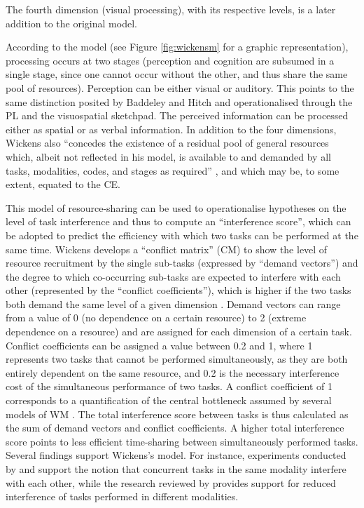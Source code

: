 The fourth dimension (visual processing), with its respective levels, is a later addition \citep{wickens_multiple_2002} to the original model.


According to the model (see Figure \ref{fig:wickensm} for a graphic representation), processing occurs at two stages (perception and cognition are subsumed in a single stage, since one cannot occur without the other, and thus share the same pool of resources). Perception can be either visual or auditory. This points to the same distinction posited by Baddeley and Hitch and operationalised through the PL and the visuospatial sketchpad. The perceived information can be processed either as spatial or as verbal information. In addition to the four dimensions, Wickens also ``concedes the existence of a residual pool of general resources which, albeit not reflected in his model, is available to and demanded by all tasks, modalities, codes, and stages as required'' \citep[1382]{seeber_thinking_2007}, and which may be, to some extent, equated to the CE.

This model of resource-sharing can be used to operationalise hypotheses on the level of task interference and thus to compute an ``interference score'', which can be adopted to predict the efficiency with which two tasks can be performed at the same time. Wickens develops a ``conflict matrix'' (CM) to show the level of resource recruitment by the single sub-tasks (expressed by ``demand vectors'') and the degree to which co-occurring sub-tasks are expected to interfere with each other (represented by the ``conflict coefficients''), which is higher if the two tasks both demand the same level of a given dimension \citep{wickens_multiple_2002}. Demand vectors can range from a value of 0 (no dependence on a certain resource) to 2 (extreme dependence on a resource) and are assigned for each dimension of a certain task. Conflict coefficients can be assigned a value between 0.2 and 1, where 1 represents two tasks that cannot be performed simultaneously, as they are both entirely dependent on the same resource, and 0.2 is the necessary interference cost of the simultaneous performance of two tasks. A conflict coefficient of 1 corresponds to a quantification of the central bottleneck assumed by several models of WM \citep{wickens_multiple_2002}. The total interference score between tasks is thus calculated as the sum of demand vectors and conflict coefficients. A higher total interference score points to less efficient time-sharing between simultaneously performed tasks. Several findings support Wickens's model. For instance, experiments conducted by \citet{wolfe_divided_2012} and \citet{mcleod_dual_1977} support the notion that concurrent tasks in the same modality interfere with each other, while the research reviewed by \citet{lu_supporting_2013} provides support for reduced interference of tasks performed in different modalities.


